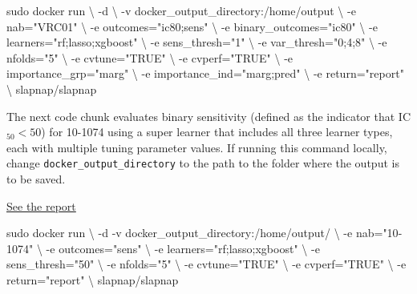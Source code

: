 \documentclass[
]{article}
\newenvironment{Shaded}{\begin{snugshade}}{\end{snugshade}}
\newcommand{\ExtensionTok}[1]{#1}
\newcommand{\FunctionTok}[1]{\textcolor[rgb]{0.00,0.00,0.00}{#1}}
\newcommand{\NormalTok}[1]{#1}
\newcommand{\StringTok}[1]{\textcolor[rgb]{0.31,0.60,0.02}{#1}}
\begin{document}
\begin{Shaded}
\begin{Highlighting}[]
\FunctionTok{sudo}\NormalTok{ docker run \textbackslash{}}
\NormalTok{    {-}d \textbackslash{}}
\NormalTok{    {-}v docker\_output\_directory:/home/output \textbackslash{}}
\NormalTok{    {-}e nab=}\StringTok{"VRC01"}\NormalTok{ \textbackslash{}}
\NormalTok{    {-}e outcomes=}\StringTok{"ic80;sens"}\NormalTok{ \textbackslash{}}
\NormalTok{    {-}e binary\_outcomes=}\StringTok{"ic80"}\NormalTok{ \textbackslash{}}
\NormalTok{    {-}e learners=}\StringTok{"rf;lasso;xgboost"}\NormalTok{ \textbackslash{}}
\NormalTok{    {-}e sens\_thresh=}\StringTok{"1"}\NormalTok{ \textbackslash{}}
\NormalTok{    {-}e var\_thresh=}\StringTok{"0;4;8"}\NormalTok{ \textbackslash{}}
\NormalTok{    {-}e nfolds=}\StringTok{"5"}\NormalTok{ \textbackslash{}}
\NormalTok{    {-}e cvtune=}\StringTok{"TRUE"}\NormalTok{ \textbackslash{}}
\NormalTok{    {-}e cvperf=}\StringTok{"TRUE"}\NormalTok{ \textbackslash{}}
\NormalTok{    {-}e importance\_grp=}\StringTok{"marg"}\NormalTok{ \textbackslash{}}
\NormalTok{    {-}e importance\_ind=}\StringTok{"marg;pred"}\NormalTok{ \textbackslash{}}
\NormalTok{    {-}e return=}\StringTok{"report"}\NormalTok{ \textbackslash{}}
\NormalTok{    slapnap/slapnap}
\end{Highlighting}
\end{Shaded}

The next code chunk evaluates binary sensitivity (defined as the indicator that IC\(_{50} < 50\)) for 10-1074 using a super learner that includes all three learner types, each with multiple tuning parameter values. If running this command locally, change \texttt{docker\_output\_directory} to the path to the folder where the output is to be saved.

\href{reports/report_10-1074.html}{See the report}

\begin{Shaded}
\begin{Highlighting}[]
\FunctionTok{sudo}\NormalTok{ docker run \textbackslash{}}
\NormalTok{    {-}d}
    \ExtensionTok{{-}v}\NormalTok{ docker\_output\_directory:/home/output/ \textbackslash{}}
\NormalTok{    {-}e nab=}\StringTok{"10{-}1074"}\NormalTok{ \textbackslash{}}
\NormalTok{    {-}e outcomes=}\StringTok{"sens"}\NormalTok{ \textbackslash{}}
\NormalTok{    {-}e learners=}\StringTok{"rf;lasso;xgboost"}\NormalTok{ \textbackslash{}}
\NormalTok{    {-}e sens\_thresh=}\StringTok{"50"}\NormalTok{ \textbackslash{}}
\NormalTok{    {-}e nfolds=}\StringTok{"5"}\NormalTok{ \textbackslash{}}
\NormalTok{    {-}e cvtune=}\StringTok{"TRUE"}\NormalTok{ \textbackslash{}}
\NormalTok{    {-}e cvperf=}\StringTok{"TRUE"}\NormalTok{ \textbackslash{}}
\NormalTok{    {-}e return=}\StringTok{"report"}\NormalTok{ \textbackslash{}}
\NormalTok{    slapnap/slapnap}
\end{Highlighting}
\end{Shaded}
\end{document}
